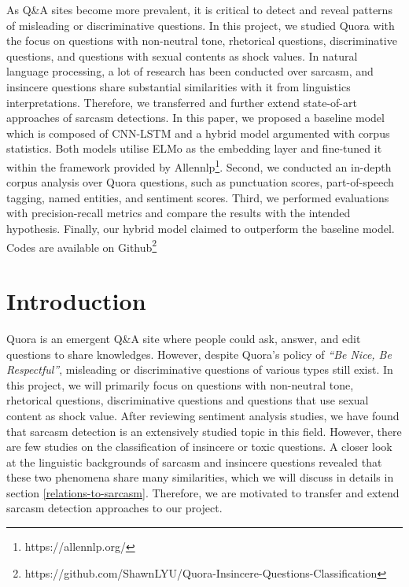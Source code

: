 \documentclass[12pt]{diazessay} %
\begin{document}
As Q\&A sites become more prevalent, it is critical to detect and reveal patterns of misleading or discriminative questions. In this project, we studied Quora with the focus on questions with non-neutral tone, rhetorical questions, discriminative questions, and questions with sexual contents as shock values. In natural language processing, a lot of research has been conducted over sarcasm, and insincere questions share substantial similarities with it from linguistics interpretations. Therefore,  we transferred and further extend state-of-art approaches of sarcasm detections. In this paper, we proposed a baseline model which is composed of CNN-LSTM and a hybrid model argumented with corpus statistics. Both models utilise ELMo\citep{peters2018deep} as the embedding layer and fine-tuned it within the framework provided by Allennlp\footnote{https://allennlp.org/}. Second, we conducted an in-depth corpus analysis over Quora questions, such as punctuation scores, part-of-speech tagging, named entities, and sentiment scores. Third, we performed evaluations with precision-recall metrics and compare the results with the intended hypothesis. Finally, our hybrid model claimed to outperform the baseline model. Codes are available on Github\footnote{https://github.com/ShawnLYU/Quora-Insincere-Questions-Classification}



\section{Introduction}

Quora is an emergent Q\&A site where people could ask, answer, and edit questions to share knowledges. However, despite Quora's policy of \textit{``Be Nice, Be Respectful''}, misleading or discriminative questions of various types still exist. In this project, we will primarily focus on questions with non-neutral tone, rhetorical questions, discriminative questions and questions that use sexual content as shock value. After reviewing sentiment analysis studies, we have found that sarcasm detection is an extensively studied topic in this field. However, there are few studies on the classification of insincere or toxic questions. A closer look at the linguistic backgrounds of sarcasm and insincere questions revealed that these two phenomena share many similarities, which we will discuss in details in section \ref{relations-to-sarcasm}. Therefore, we are motivated to transfer and extend sarcasm detection approaches to our project. 
\end{document}

